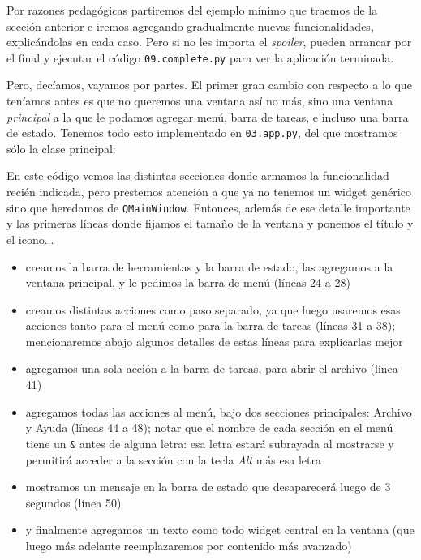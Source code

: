 Por razones pedagógicas partiremos del ejemplo mínimo que traemos de la sección anterior e iremos agregando gradualmente nuevas funcionalidades, explicándolas en cada caso. Pero si no les importa el \textit{spoiler}, pueden arrancar por el final y ejecutar el código \texttt{09.complete.py} para ver la aplicación terminada.

Pero, decíamos, vayamos por partes. El primer gran cambio con respecto a lo que teníamos antes es que no queremos una ventana así no más, sino una ventana \textit{principal} a la que le podamos agregar menú, barra de tareas, e incluso una barra de estado. Tenemos todo esto implementado en \texttt{03.app.py}, del que mostramos sólo la clase principal:


En este código vemos las distintas secciones donde armamos la funcionalidad recién indicada, pero prestemos atención a que ya no tenemos un widget genérico sino que heredamos de \texttt{QMainWindow}. Entonces, además de ese detalle importante y las primeras líneas donde fijamos el tamaño de la ventana y ponemos el título y el icono...

\begin{itemize}
    \item creamos la barra de herramientas y la barra de estado, las agregamos a la ventana principal, y le pedimos la barra de menú (líneas 24 a 28)
    \item creamos distintas acciones como paso separado, ya que luego usaremos esas acciones tanto para el menú como para la barra de tareas (líneas 31 a 38); mencionaremos abajo algunos detalles de estas líneas para explicarlas mejor
    \item agregamos una sola acción a la barra de tareas, para abrir el archivo (línea 41)
    \item agregamos todas las acciones al menú, bajo dos secciones principales: Archivo y Ayuda (líneas 44 a 48); notar que el nombre de cada sección en el menú tiene un \texttt{\&} antes de alguna letra: esa letra estará subrayada al mostrarse y permitirá acceder a la sección con la tecla \textit{Alt} más esa letra
    \item mostramos un mensaje en la barra de estado que desaparecerá luego de 3 segundos (línea 50)
    \item y finalmente agregamos un texto como todo widget central en la ventana (que luego más adelante reemplazaremos por contenido más avanzado)
\end{itemize}

